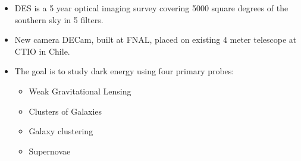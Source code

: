 \documentclass[aspectratio=169]{beamer}
\begin{document}
{\begin{columns}
\begin{column}{0.5\textwidth}
\begin{itemize}
                \item DES is a 5 year optical imaging survey covering 5000
                    square degrees of the southern sky in 5 filters.

                \item New camera DECam, built at FNAL, placed on existing 4
                    meter telescope at CTIO in Chile.

                \item The goal is to study dark energy using four primary probes:  
                    \begin{itemize}
                        \item Weak Gravitational Lensing
                        \item Clusters of Galaxies
                        \item Galaxy clustering
                        \item Supernovae
                    \end{itemize}

            \end{itemize}

        \end{column}

    \end{columns}


}
\end{document}
